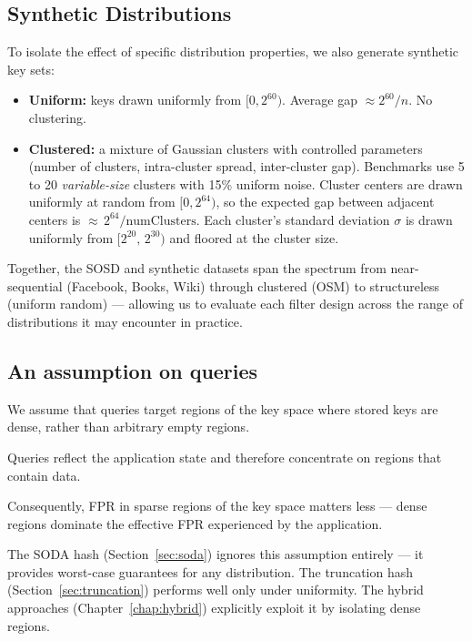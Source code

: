\subsection{Synthetic Distributions}
\label{subsec:synthetic-distributions}

To isolate the effect of specific distribution properties, we also generate synthetic
key sets:

\begin{itemize}
    \item \textbf{Uniform:} keys drawn uniformly from $[0, 2^{60})$.
    Average gap $\approx 2^{60}/n$.
    No clustering.
    \item \textbf{Clustered:} a mixture of Gaussian clusters with controlled parameters
    (number of clusters, intra-cluster spread, inter-cluster gap).
    Benchmarks use 5 to 20 \emph{variable-size} clusters with 15\% uniform noise.
    Cluster centers are drawn uniformly at random from $[0, 2^{64})$,
    so the expected gap between adjacent centers is ${\approx}\,2^{64}/\text{numClusters}$.
    Each cluster's standard deviation $\sigma$ is drawn uniformly from
    $[2^{20},\,2^{30})$ and floored at the cluster size.
\end{itemize}

Together, the SOSD and synthetic datasets span the spectrum from near-sequential
(Facebook, Books, Wiki) through clustered (OSM) to structureless (uniform
random) --- allowing us to evaluate each filter design across the range of distributions
it may encounter in practice.

\subsection{An assumption on queries}
\label{subsec:assumption}

We assume that queries target regions of the key space where stored keys are dense,
rather than arbitrary empty regions.

\begin{assumption}
    Queries reflect the application state and therefore concentrate on
    regions that contain data.
\end{assumption}

Consequently, FPR in sparse regions of the key space matters less --- dense regions
dominate the effective FPR experienced by the application.

The SODA hash (Section~\ref{sec:soda}) ignores this assumption entirely --- it provides
worst-case guarantees for any distribution. The truncation hash
(Section~\ref{sec:truncation}) performs well only under uniformity. The hybrid approaches
(Chapter~\ref{chap:hybrid}) explicitly exploit it by isolating dense regions.

